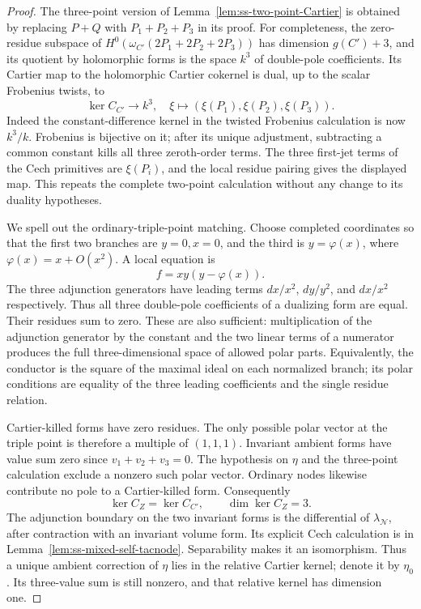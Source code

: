 \begin{proof}
The three-point version of Lemma~\ref{lem:ss-two-point-Cartier}
is obtained by replacing $P+Q$ with $P_1+P_2+P_3$ in its proof.
For completeness, the zero-residue subspace of
$H^0(\omega_{C'}(2P_1+2P_2+2P_3))$ has dimension $g(C')+3$,
and its quotient by holomorphic forms is the space $k^3$ of
double-pole coefficients. Its Cartier map to the holomorphic
Cartier cokernel is dual, up to the scalar Frobenius twists, to
\[
     \ker C_{C'}\longrightarrow k^3,
     \quad\xi\longmapsto(\xi(P_1),\xi(P_2),\xi(P_3)).
\]
Indeed the constant-difference kernel in the twisted Frobenius
calculation is now $k^3/k$. Frobenius is bijective on it; after
its unique adjustment, subtracting a common constant kills all
three zeroth-order terms. The three first-jet terms of the Cech
primitives are $\xi(P_i)$, and the local residue pairing gives
the displayed map. This repeats the complete two-point calculation
without any change to its duality hypotheses.

We spell out the ordinary-triple-point matching. Choose completed
coordinates so that the first two branches are $y=0,x=0$, and
the third is $y=\varphi(x)$, where
$\varphi(x)=x+O(x^2)$. A local equation is
\[
                         f=xy(y-\varphi(x)).
\]
The three adjunction generators have leading terms
$dx/x^2$, $dy/y^2$, and $dx/x^2$ respectively.
Thus all three double-pole coefficients of a dualizing form are
equal. Their residues sum to zero. These are also sufficient:
multiplication of the adjunction generator by the constant and
the two linear terms of a numerator produces the full
three-dimensional space of allowed polar parts. Equivalently,
the conductor is the square of the maximal ideal on each
normalized branch; its polar conditions are equality of the
three leading coefficients and the single residue relation.

Cartier-killed forms have zero residues. The only possible polar
vector at the triple point is therefore a multiple of $(1,1,1)$.
Invariant ambient forms have value sum zero since $v_1+v_2+v_3=0$.
The hypothesis on $\eta$ and the three-point calculation exclude
a nonzero such polar vector. Ordinary nodes likewise contribute
no pole to a Cartier-killed form. Consequently
\[
               \ker C_Z=\ker C_{C'},\qquad\dim\ker C_Z=3.
\]
The adjunction boundary on the two invariant forms is the
differential of $\lambda_{\mathcal N}$, after contraction with
an invariant volume form. Its explicit Cech calculation is in
Lemma~\ref{lem:ss-mixed-self-tacnode}. Separability makes it an
isomorphism. Thus a unique ambient correction of $\eta$ lies in
the relative Cartier kernel; denote it by $\eta_0$. Its three-value
sum is still nonzero, and that relative kernel has dimension one.


\end{proof}
